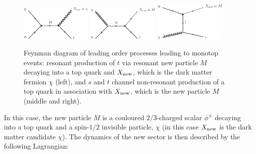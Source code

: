 \begin{figure}[!h!tpd]
\centering
\includegraphics[width=0.31\textwidth]{figures/singletop/feyn_diags/Resonant}
\includegraphics[width=0.31\textwidth]{figures/singletop/feyn_diags/NonResonant}
\includegraphics[width=0.31\textwidth]{figures/singletop/feyn_diags/NonResonant2}
\caption
{
Feynman diagram of leading order processes leading to monotop events: resonant production of
$t$ via resonant new particle $M$ decaying into a top quark and $X_{\mathrm{new}}$, which is the dark matter fermion $\chi$ (left),
and $s$ and $t$ channel non-resonant production of a top quark in association with $X_{\mathrm{new}}$, which is the new particle $M$ (middle and right).
}
\label{fig:feyn_prod}

\end{figure}

\label{sec:ResonantProd}

In this case, the new particle $M$ is a couloured $2/3$-charged scalar $\phi^{\pm}$ decaying into a top quark and a spin-$1/2$ invisible particle, $\chi$ (in this case $X_{\mathrm{new}}$ is the dark matter candidate $\chi$). 
The dynamics of the new sector is then described by the following Lagrangian:

